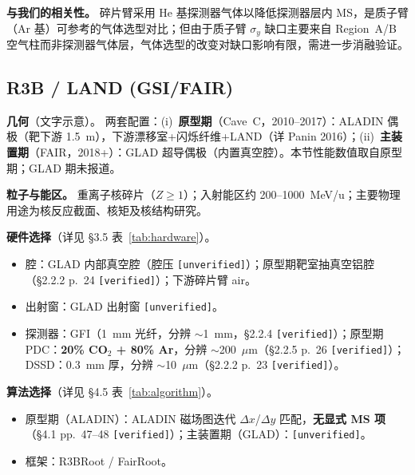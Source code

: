 \documentclass[a4paper, 11pt]{article}
\begin{document}
\textbf{与我们的相关性。}
碎片臂采用 He 基探测器气体以降低探测器层内 MS，是质子臂（Ar 基）可参考的气体选型对比；但由于质子臂 $\sigma_y$ 缺口主要来自 Region~A/B 空气柱而非探测器气体层，气体选型的改变对缺口影响有限，需进一步消融验证。

\subsection{R3B / LAND (GSI/FAIR)}
\label{sec:card_r3b}

\textbf{几何}（文字示意）。
两套配置：(i)~\textbf{原型期}（Cave~C，2010--2017）：ALADIN 偶极（靶下游 1.5~m），下游漂移室+闪烁纤维+LAND（详 Panin 2016）；(ii)~\textbf{主装置期}（FAIR，2018+）：GLAD 超导偶极（内置真空腔）。本节性能数值取自原型期；GLAD 期未报道。

\textbf{粒子与能区。}
重离子核碎片（$Z \geq 1$）；入射能区约 200--1000~MeV/u；主要物理用途为核反应截面、核矩及核结构研究。

\textbf{硬件选择}（详见 §3.5 表~\ref{tab:hardware}）。
\begin{itemize}[leftmargin=2em,itemsep=0pt]
\item 腔：GLAD 内部真空腔（腔压 \texttt{[unverified]}）；原型期靶室抽真空铝腔（§2.2.2 p.~24 \texttt{[verified]}）；下游碎片臂 air。
\item 出射窗：GLAD 出射窗 \texttt{[unverified]}。
\item 探测器：GFI（1~mm 光纤，分辨 $\sim$1~mm，§2.2.4 \texttt{[verified]}）；原型期 PDC：\textbf{20\% CO$_2$ + 80\% Ar}，分辨 $\sim$200~$\mu$m（§2.2.5 p.~26 \texttt{[verified]}）；DSSD：0.3~mm 厚，分辨 $\sim$10~$\mu$m（§2.2.2 p.~23 \texttt{[verified]}）。
\end{itemize}

\textbf{算法选择}（详见 §4.5 表~\ref{tab:algorithm}）。
\begin{itemize}[leftmargin=2em,itemsep=0pt]
\item 原型期（ALADIN）：ALADIN 磁场图迭代 $\Delta x$/$\Delta y$ 匹配，\textbf{无显式 MS 项}（§4.1 pp.~47--48 \texttt{[verified]}）；主装置期（GLAD）：\texttt{[unverified]}。
\item 框架：R3BRoot / FairRoot。
\end{itemize}
\end{document}
